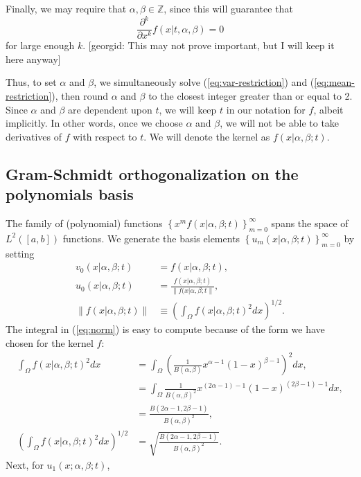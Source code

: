 \documentclass[10pt]{article}
\begin{document}
Finally, we may require that $\alpha, \beta \in \mathbb{Z}$, since
this will guarantee that
\[
  \frac{\partial^k}{\partial x^k} f(x|t,\alpha,\beta) = 0
\]
for large enough $k$. [georgid: This may not prove important, but I
will keep it here anyway]

Thus, to set $\alpha$ and $\beta$, we simultaneously solve
(\ref{eq:var-restriction}) and (\ref{eq:mean-restriction}), then round
$\alpha$ and $\beta$ to the closest integer greater than or equal to
2. Since $\alpha$ and $\beta$ are dependent upon $t$, we will keep $t$
in our notation for $f$, albeit implicitly. In other words, once we
choose $\alpha$ and $\beta$, we will not be able to take derivatives
of $f$ with respect to $t$. We will denote the kernel as
$f(x| \alpha, \beta ; t)$.

\subsection{Gram-Schmidt orthogonalization on the polynomials basis}
The family of (polynomial) functions
$\left\{ x^m f(x| \alpha, \beta; t) \right\}_{m=0}^\infty$ spans the
space of $L^2([a,b])$ functions. We generate the basis elements
$\left\{ u_m(x|\alpha,\beta;t) \right\}_{m=0}^\infty$ by setting
\begin{align}
  v_0(x| \alpha, \beta; t) &= f(x| \alpha, \beta; t), \nonumber \\
  u_0(x| \alpha, \beta; t) &= \frac{f(x| \alpha, \beta; t)}{\|f(x|\alpha, \beta; t\|}, \label{eq:u0} \\
  \|f(x|\alpha,\beta;t) \| &\equiv \left( \int_{\Omega} f(x|\alpha,\beta;t)^2 dx \right)^{1/2}. \label{eq:norm}
\end{align}
The integral in (\ref{eq:norm}) is easy to compute because of the form
we have chosen for the kernel $f:$
\begin{align*}
  \int_{\Omega} f(x|\alpha,\beta;t)^2 dx  &= \int_{\Omega} \left( \frac{1}{B(\alpha,\beta)} x^{\alpha-1}(1-x)^{\beta-1} \right)^{2} dx, \\
                                          &= \int_{\Omega} \frac{1}{B(\alpha,\beta)^2} x^{(2\alpha-1)-1}(1-x)^{(2\beta-1)-1} dx, \\
                                          &= \frac{B(2\alpha-1, 2\beta-1)}{B(\alpha,\beta)^2}, \\
  \left( \int_{\Omega} f(x|\alpha,\beta;t)^2 dx \right)^{1/2} &= \sqrt{\frac{B(2\alpha-1, 2\beta-1)}{B(\alpha,\beta)^2}}.
\end{align*}
Next, for $u_1(x;\alpha,\beta;t)$,
\end{document}
